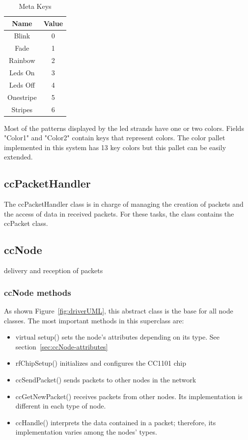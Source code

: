 \begin{table}[h]
  \centering
  \begin{tabular}{ c | c }
    \hline
    \textbf{Name} & \textbf{Value}\\ [0.5ex]    
    \hline
    Blink & 0 \\
    Fade & 1 \\
    Rainbow & 2\\
    Leds On & 3\\
    Leds Off & 4\\ 
    Onestripe & 5\\
    Stripes & 6 \\
    \hline
  \end{tabular}
  \caption[Meta Keys]%
          {Meta Keys}
  \label{Meta Keys}
\end{table}

Most of the patterns displayed by the led strands have one or two colors. Fields "Color1" and "Color2" contain   keys that represent colors. The color pallet implemented in this system has 13 key colors but this pallet can be easily extended. 

\subsection{ccPacketHandler}
\label{sec:ccPacketHandler}
The ccPacketHandler class is in charge of managing the creation of packets and the access of data in received packets. For these tasks, the class contains the ccPacket class. 

\subsection{ccNode}
delivery and reception of packets
\subsubsection{ccNode methods}
As shown Figure~\ref{fig:driverUML}, this abstract class is the base for all node classes. The most important methods in this superclass are:
\begin{itemize}
\item virtual setup() sets the node's attributes depending on its type. See section~\ref{sec:ccNode-attributes} 
\item rfChipSetup() initializes and configures the CC1101 chip 
\item ccSendPacket() sends packets to other nodes in the network
\item ccGetNewPacket() receives packets from other nodes. Its implementation is different in each type of node.
\item ccHandle() interprets the data contained in a packet; therefore, its implementation varies among the nodes' types.
\end{itemize}

